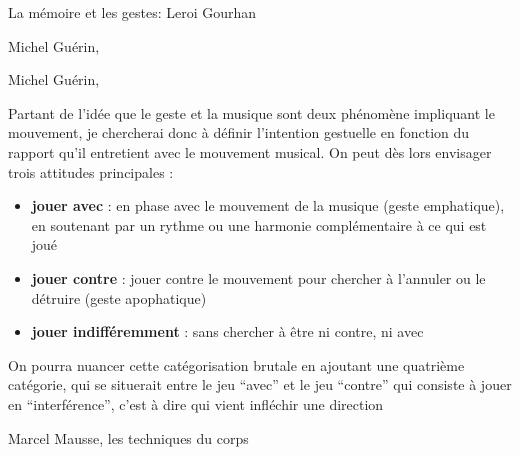 La mémoire et les gestes:
Leroi Gourhan

 Michel Guérin, \cite{guerin_philosophie_2018}


 Michel Guérin, \cite{guerin_philosophie_2018}









Partant de l'idée que le geste et la musique sont deux phénomène impliquant le mouvement, je chercherai donc à définir l'intention gestuelle en fonction du rapport qu'il entretient avec le mouvement musical.
On peut dès lors envisager trois attitudes principales :
\vspace{-1em}
\begin{itemize}[noitemsep]
\item \textbf{jouer avec} : en phase avec le mouvement de la musique (geste emphatique), en soutenant par un rythme ou une harmonie complémentaire à ce qui est joué
\item \textbf{jouer contre} : jouer contre le mouvement pour chercher à l'annuler ou le détruire (geste apophatique)
\item \textbf{jouer indifféremment} : sans chercher à être ni contre, ni avec
\end{itemize}

On pourra nuancer cette catégorisation brutale en ajoutant une quatrième catégorie, qui se situerait entre 
le jeu ``avec'' et le jeu ``contre'' qui consiste à jouer en ``interférence'', c'est à dire qui vient infléchir une direction


 Marcel Mausse, les techniques du corps

